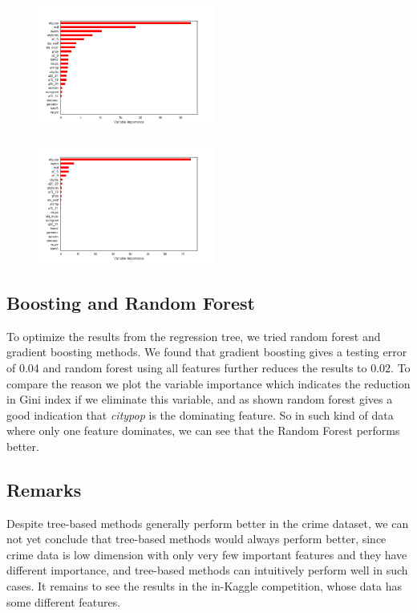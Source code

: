 \documentclass{article}
\begin{document}
\begin{figure}
\centering
\begin{minipage}{.5\textwidth}
  \centering
  \includegraphics[width=.8\linewidth,height=4cm]{crime_boosttu}
  \label{fig:test1}
\end{minipage}%
\begin{minipage}{.5\textwidth}
  \centering
  \includegraphics[width=.8\linewidth,height=4cm]{crime_randtu}
  \label{fig:test2}
\end{minipage}
\end{figure}


\subsection{Boosting and Random Forest}
To optimize the results from the regression tree, we tried random forest and gradient boosting methods. We found that gradient boosting gives a testing error of 0.04 and random forest using all features further reduces the results to 0.02. To compare the reason we plot the variable importance which indicates the reduction in Gini index if we eliminate this variable, and as shown random forest gives a good indication that \textit{citypop} is the dominating feature. So in such kind of data where only one feature dominates, we can see that the Random Forest performs better.

\subsection{Remarks}
Despite tree-based methods generally perform better in the crime dataset, we can not yet conclude that tree-based methods would always perform better, since crime data is low dimension with only very few important features and they have different importance, and tree-based methods can intuitively perform well in such cases. It remains to see the results in the in-Kaggle competition, whose data has some different features.
\end{document}
